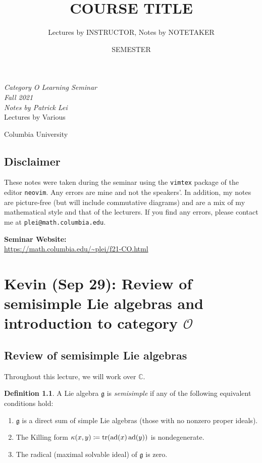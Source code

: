\documentclass[leqno, openany]{memoir}
\title{COURSE TITLE}
\author{Lectures by INSTRUCTOR, Notes by NOTETAKER}
\date{SEMESTER}
\theoremstyle{definition}
\newtheorem{defn}[thm]{Definition}
\theoremstyle{remark}
\theoremstyle{plain}
\theoremstyle{definition}
\theoremstyle{remark}
\newcommand{\C}{\mathbb{C}}
\newcommand{\mc}[1]{\mathcal{#1}}
\newcommand{\mf}[1]{\mathfrak{#1}}
\DeclareMathOperator{\ad}{ad}
\newcommand*{\titleSW}
    {\begingroup%
    \raggedleft
    \vspace*{\baselineskip}
    {\Huge\itshape Category O Learning Seminar \\ Fall 2021}\\[\baselineskip]
    {\large\itshape Notes by Patrick Lei}\\[0.2\textheight]
    {\Large Lectures by Various}\par
    \vfill
    {\Large \sffamily Columbia University}
    \vspace*{\baselineskip}
\endgroup}
\begin{document}
    
\begin{titlingpage}
\titleSW
\end{titlingpage}

\thispagestyle{empty}
\section*{Disclaimer}%
\label{sec:disclaimer}

These notes were taken during the seminar using the \texttt{vimtex} package of
the editor \texttt{neovim}.  Any errors are mine and not the speakers'.  In
addition, my notes are picture-free (but will include commutative diagrams) and
are a mix of my mathematical style and that of the lecturers.  If you find any
errors, please contact me at \texttt{plei@math.columbia.edu}.

\vspace*{1cm}

\noindent\textbf{Seminar Website:}\\
\url{https://math.columbia.edu/~plei/f21-CO.html} \newpage

\tableofcontents

\chapter{Kevin (Sep 29): Review of semisimple Lie algebras and introduction to category $\mc{O}$}%
\label{cha:kevin_sep_29_review_of_semisimple_lie_algebras_and_introduction_to_category_o}

\section{Review of semisimple Lie algebras}%
\label{sec:review_of_semisimple_lie_algebras}

Throughout this lecture, we will work over $\C$. 

\begin{defn}
    A Lie algebra $\mf{g}$ is \textit{semisimple} if any of the following equivalent conditions hold:
    \begin{enumerate}
        \item $\mf{g}$ is a direct sum of simple Lie algebras (those with no nonzero proper ideals).
        \item The Killing form $\kappa(x,y) \coloneqq \tr (\ad(x) \ad(y))$ is nondegenerate.
        \item The radical (maximal solvable ideal) of $\mf{g}$ is zero.
    \end{enumerate}
\end{defn}
\end{document}
